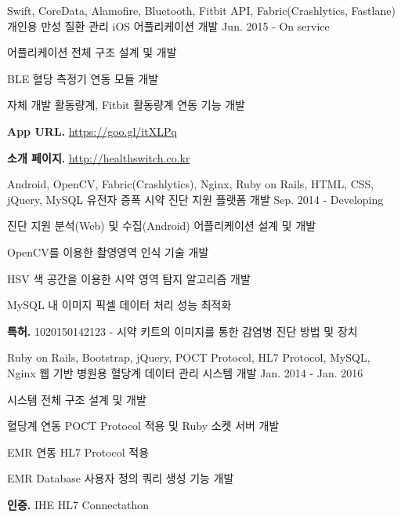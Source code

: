 \begin{cvexpentries}
  \cvexpentry
    {Swift, CoreData, Alamofire, Bluetooth, Fitbit API, Fabric(Crashlytics, Fastlane)}
    {개인용 만성 질환 관리 iOS 어플리케이션 개발}
    {Jun. 2015 - On service}
    {}
    {
        \begin{cvitems}
            \item {어플리케이션 전체 구조 설계 및 개발}
            \item {BLE 혈당 측정기 연동 모듈 개발}
            \item {자체 개발 활동량계, Fitbit 활동량계 연동 기능 개발}
            \item {\textbf{App URL.} \href{https://goo.gl/itXLPq}{https://goo.gl/itXLPq}}
            \item {\textbf{소개 페이지.} \href{http://healthswitch.co.kr/}{http://healthswitch.co.kr}}
        \end{cvitems}
    }
\end{cvexpentries}

\begin{cvexpentries}
  \cvexpentry
    {Android, OpenCV, Fabric(Crashlytics), Nginx, Ruby on Rails, HTML, CSS, jQuery, MySQL}
    {유전자 증폭 시약 진단 지원 플랫폼 개발}
    {Sep. 2014 - Developing}
    {}
    {
        \begin{cvitems}
            \item {진단 지원 분석(Web) 및 수집(Android) 어플리케이션 설계 및 개발}
            \item {OpenCV를 이용한 촬영영역 인식 기술 개발}
            \item {HSV 색 공간을 이용한 시약 영역 탐지 알고리즘 개발}
            \item {MySQL 내 이미지 픽셀 데이터 처리 성능 최적화}
            \item {\textbf{특허.} 1020150142123 - 시약 키트의 이미지를 통한 감염병 진단 방법 및 장치}
        \end{cvitems}
    }
\end{cvexpentries}

\begin{cvexpentries}
  \cvexpentry
    {Ruby on Rails, Bootstrap, jQuery, POCT Protocol, HL7 Protocol, MySQL, Nginx}
    {웹 기반 병원용 혈당계 데이터 관리 시스템 개발}
    {Jan. 2014 - Jan. 2016}
    {}
    {
        \begin{cvitems}
            \item {시스템 전체 구조 설계 및 개발}
            \item {혈당계 연동 POCT Protocol 적용 및 Ruby 소켓 서버 개발}
            \item {EMR 연동 HL7 Protocol 적용}
            \item {EMR Database 사용자 정의 쿼리 생성 기능 개발}
            \item {\textbf{인증.} IHE HL7 Connectathon}
        \end{cvitems}
    }
\end{cvexpentries}

